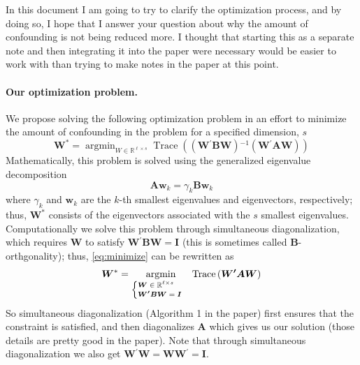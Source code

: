 \documentclass[12pt]{article} %
\newcommand{\inv}{\ensuremath{^{-1}}}
\newcommand{\trans}{\ensuremath{^\prime}}
\DeclareMathOperator{\tr}{Trace}
\DeclareMathOperator*{\argmin}{argmin}
\begin{document}
In this document I am going to try to clarify the optimization process, and by doing so, I hope that I answer your question about why the amount of confounding is not being reduced more. I thought that starting this as a separate note and then integrating it into the paper were necessary would be easier to work with than trying to make notes in the paper at this point.

\paragraph{Our optimization problem.} We propose solving the following optimization problem in an effort to minimize the amount of confounding in the problem for a specified dimension, $s$
%
\begin{equation}\label{eq:minimize}
\bm{W}^* = \argmin_{W \in \mathbb{R}^{\ell \times s} } 
\tr\left( \left(\bm{W\trans B W} \right)\inv \left(\bm{W\trans A W}\right) \right)
\end{equation}
%
Mathematically, this problem is solved using the generalized eigenvalue decomposition
\begin{equation}\label{eq:geigen}
	\bm{Aw}_k = \gamma_k \bm{Bw}_k
\end{equation}
where $\gamma_k$ and $\bm{w}_k$ are the $k$-th smallest eigenvalues and eigenvectors, respectively; thus, $\bm{W}^*$ consists of the eigenvectors associated with the $s$ smallest eigenvalues. Computationally we solve this problem through simultaneous diagonalization, which requires $\bm{W}$ to satisfy $\bm{W\trans B W} = \bm{I}$ (this is sometimes called $\bm{B}$-orthgonality); thus, \eqref{eq:minimize} can be rewritten as
%
\begin{equation}
\bm{W}^* = \argmin_{ 
\begin{scriptsize}
	\begin{cases}
      \bm{W} \in \mathbb{R}^{\ell \times s} \\
      \bm{W\trans B W} = \bm{I}
	\end{cases}
\end{scriptsize}
	} 
\tr\left( \bm{W\trans A W} \right) 
\end{equation}
%
So simultaneous diagonalization (Algorithm 1 in the paper) first ensures that the constraint is satisfied, and then diagonalizes $\bm{A}$ which gives us our solution (those details are pretty good in the paper). Note that through simultaneous diagonalization we also get $\bm{W}\trans \bm{W} = \bm{WW}\trans = \bm{I}$.
\end{document}
